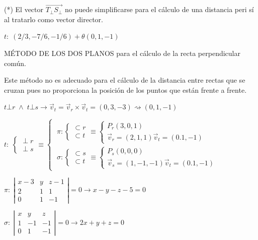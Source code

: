  \noindent (*) \textcolor{gris}{El vector $\overrightarrow{T_\bot S_\bot}$ no puede simplificarse para el cálculo de una distancia peri sí al tratarlo como vector director}.
 
\noindent $t:\; (2/3,-7/6,-1/6)+\theta (0,1,-1)$

\vspace{2mm} \noindent  MÉTODO DE LOS DOS PLANOS para el cálculo de la recta perpendicular común.

\noindent \noindent \textcolor{gris}{Este método no es adecuado para el cálculo de la distancia entre rectas que se cruzan pues no proporciona la posición de los puntos que están frente a frente}.

\noindent $t\bot r\; \wedge \; t\bot s \to \vec v_t=\vec v_r \times \vec v_t =(0,3,-3) \rightsquigarrow (0,1,-1)$

\noindent $t:\;\begin{cases} \; \bot \;r \\ \;\bot \;s \end{cases} 
\equiv 
\begin{cases}\;\pi :\begin{cases} \subset r \\  \subset t \end{cases} 
\equiv \begin{cases} P_r(3,0,1)\\ \vec v_r=(2,1,1) \vec v_t=(0.1,-1) \end{cases}
\\  
\;\sigma :\begin{cases} \subset s \\  \subset t \end{cases}
\equiv \begin{cases} P_s(0,0,0)\\ \vec v_s=(1,-1,-1) \vec v_t=(0.1,-1) \end{cases}
 \end{cases}$
 
 \noindent $\pi:\; \left| \begin{matrix} x-3&y&z-1 \\ 2&1&1 \\ 0&1&-1 \end{matrix} \right|=0 \to x-y-z-5=0$
 
 \noindent $\sigma:\; \left| \begin{matrix} x&y&z \\ 1&-1&-1 \\ 0&1&-1 \end{matrix} \right|=0 \to 2x+y+z=0$
 
